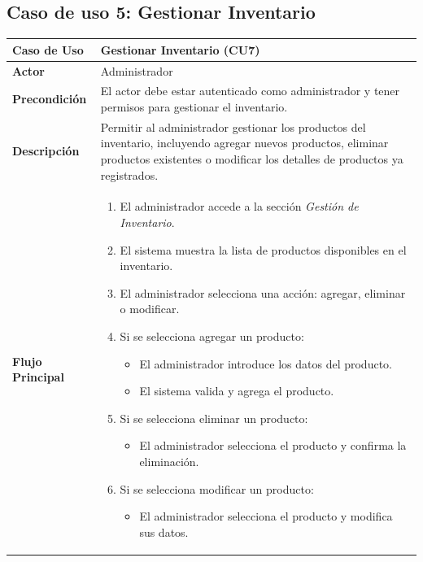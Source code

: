 \documentclass{article}
\begin{document}

\subsection{Caso de uso 5: Gestionar Inventario}

\begin{table}[H]
    \centering
    \begin{tabular}{|p{3.5cm}|p{10cm}|}
    \hline
    \textbf{Caso de Uso}   & Gestionar Inventario (CU7) \\ \hline
    \textbf{Actor}         & Administrador \\ \hline
    \textbf{Precondición}  & 
    El actor debe estar autenticado como administrador y tener permisos para gestionar el inventario. \\ \hline
    \textbf{Descripción}   & 
    Permitir al administrador gestionar los productos del inventario, incluyendo agregar nuevos productos, eliminar productos existentes o modificar los detalles de productos ya registrados. \\ \hline
    \textbf{Flujo Principal} & 
    \begin{enumerate}
        \item El administrador accede a la sección \textit{Gestión de Inventario}.
        \item El sistema muestra la lista de productos disponibles en el inventario.
        \item El administrador selecciona una acción: agregar, eliminar o modificar.
        \item Si se selecciona agregar un producto:
        \begin{itemize}
            \item El administrador introduce los datos del producto.
            \item El sistema valida y agrega el producto.
        \end{itemize}
        \item Si se selecciona eliminar un producto:
        \begin{itemize}
            \item El administrador selecciona el producto y confirma la eliminación.
        \end{itemize}
        \item Si se selecciona modificar un producto:
        \begin{itemize}
            \item El administrador selecciona el producto y modifica sus datos.

\end{itemize}
\end{enumerate}
\end{tabular}
\end{table}
\end{document}

